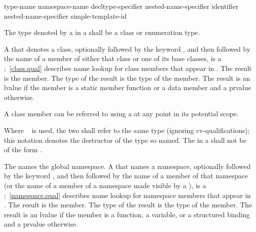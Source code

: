 %
%
%
\begin{bnf}
\br
    \terminal{::}\br
    type-name \terminal{::}\br
    namespace-name \terminal{::}\br
    decltype-specifier \terminal{::}\br
    nested-name-specifier identifier \terminal{::}\br
    nested-name-specifier  simple-template-id \terminal{::}
\end{bnf}

\pnum
The type denoted by a  in a
 shall be a class or enumeration
type.

\pnum
A  that denotes a class, optionally
followed by the keyword , and then
followed by the name of a member of either that class
or one of its base classes, is a
%
;~\ref{class.qual} describes name lookup for
class members that appear in . The result is the
member. The type of the result is the type of the member. The result is
an lvalue if the member is a static member function or a data member and a
prvalue otherwise.
\begin{note}
A class member can be referred to using a  at any
point in its potential scope.
\end{note}
Where
 \tcode{::\~}~ is used,
the two  shall refer to the same type
(ignoring cv-qualifications);
this notation denotes the destructor of the type so named.
The  in a 
shall not be of the form \tcode{\~}.

\pnum
The  \tcode{::} names the global namespace.
A  that names a
namespace, optionally followed by the keyword
, and then followed by the name of a member
of that namespace (or the name of a member of a namespace made visible by a
), is a
%
;~\ref{namespace.qual} describes name lookup for
namespace members that appear in . The result is
the member. The type of the result is the type of the member. The result
is an lvalue if the member is a function, a variable, or a structured binding and a prvalue otherwise.

